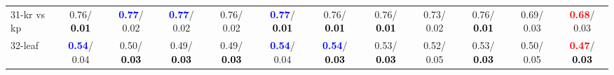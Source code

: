 \begin{table}[h]
\begin{center}
{\begin{tabular}{lc|c|c|c|c|c|c|c|c|c|c}
31-kr vs kp &   0.76/\textcolor{black}{\textbf{  0.01}} & \textcolor{blue}{\textbf{  0.77}}/  0.02 & \textcolor{blue}{\textbf{  0.77}}/  0.02 &   0.76/  0.02 & \textcolor{blue}{\textbf{  0.77}}/\textcolor{black}{\textbf{  0.01}} &   0.76/\textcolor{black}{\textbf{  0.01}} &   0.76/\textcolor{black}{\textbf{  0.01}} &   0.73/  0.02 &   0.76/\textcolor{black}{\textbf{  0.01}} &   0.69/  0.03 & \textcolor{red}{\textbf{  0.68}}/  0.03 \\
32-leaf & \textcolor{blue}{\textbf{  0.54}}/  0.04 &   0.50/\textcolor{black}{\textbf{  0.03}} &   0.49/\textcolor{black}{\textbf{  0.03}} &   0.49/\textcolor{black}{\textbf{  0.03}} & \textcolor{blue}{\textbf{  0.54}}/  0.04 & \textcolor{blue}{\textbf{  0.54}}/\textcolor{black}{\textbf{  0.03}} &   0.53/\textcolor{black}{\textbf{  0.03}} &   0.52/  0.05 &   0.53/\textcolor{black}{\textbf{  0.03}} &   0.50/  0.05 & \textcolor{red}{\textbf{  0.47}}/\textcolor{black}{\textbf{  0.03}} \\\end{tabular}
}\label{strats0b5NN}
\end{center}
\end{table}
